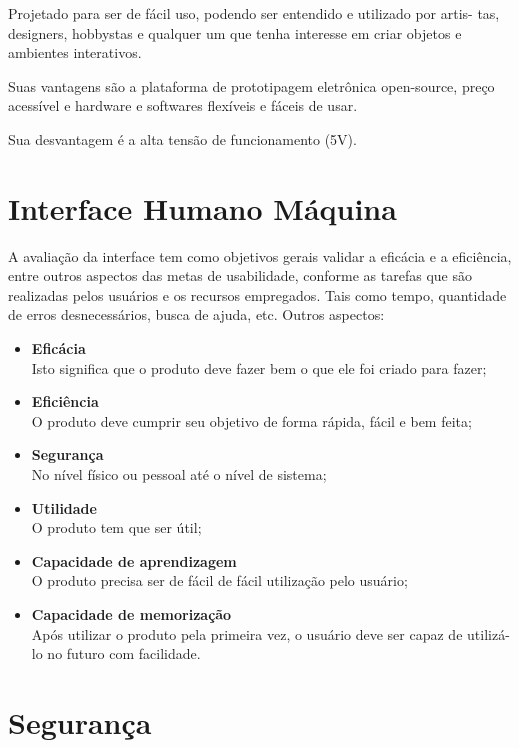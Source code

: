 	Projetado para ser de fácil uso, podendo ser entendido e utilizado por artis- tas, designers, hobbystas e qualquer um que tenha interesse em criar objetos e ambientes interativos.

	Suas vantagens são a plataforma de prototipagem eletrônica open-source, preço acessível e hardware e softwares flexíveis e fáceis de usar.

	Sua desvantagem é a alta tensão de funcionamento (5V).

\section{Interface Humano Máquina}

	A avaliação da interface tem como objetivos gerais validar a eficácia e a eficiência, entre outros aspectos das metas de usabilidade, conforme as tarefas que são realizadas pelos usuários e os recursos empregados. Tais como tempo, quantidade de erros desnecessários, busca de ajuda, etc. Outros aspectos:

\begin{itemize}
	\item \textbf{Eficácia}\\
	Isto significa que o produto deve fazer bem o que ele foi criado para fazer;

	\item \textbf{Eficiência}\\
O produto deve cumprir seu objetivo de forma rápida, fácil e bem feita;

	\item \textbf{Segurança}\\
No nível físico ou pessoal até o nível de sistema;

	\item \textbf{Utilidade}\\
O produto tem que ser útil;

	\item \textbf{Capacidade de aprendizagem}\\
O produto precisa ser de fácil de fácil utilização pelo usuário;

	\item \textbf{Capacidade de memorização}\\
Após utilizar o produto pela primeira vez, o usuário deve ser capaz de utilizá-lo no futuro com facilidade.
\end{itemize}

\section{Segurança}

